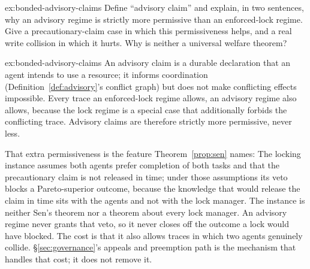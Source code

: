 \documentclass[11pt,a4paper]{article}
\theoremstyle{definition}
\theoremstyle{remark}
\begin{document}

\begin{pdexercise}[kind=Check,rating=1]{ex:bonded-advisory-claims}
Define ``advisory claim'' and explain, in two sentences, why an advisory regime is strictly more permissive than an enforced-lock regime. Give a precautionary-claim case in which this permissiveness helps, and a
real write collision in which it hurts. Why is neither a universal welfare theorem?
\end{pdexercise}
\begin{pdsolution}{ex:bonded-advisory-claims}
An advisory claim is a durable declaration that an agent intends to use a resource; it informs coordination (Definition~\ref{def:advisory}'s conflict graph) but does not make conflicting effects impossible. Every trace an enforced-lock regime allows, an advisory regime also allows, because the lock regime is a special case that additionally forbids the conflicting trace. Advisory claims are therefore strictly more permissive, never less.

That extra permissiveness is the feature Theorem~\ref{prop:sen} names: The locking instance assumes both agents prefer completion of both tasks
and that the precautionary claim is not released in time; under those
assumptions its veto blocks a Pareto-superior outcome, because the knowledge
that would release the claim in time sits with the agents and not with the
lock manager. The instance is neither Sen's theorem nor a theorem about every
lock manager. An advisory regime never grants that veto, so it never closes off the outcome a lock would have blocked. The cost is that it also allows traces in which two agents genuinely collide. \S\ref{sec:governance}'s appeals and preemption path is the mechanism that handles that cost; it does not remove it.
\end{pdsolution}

\end{document}
